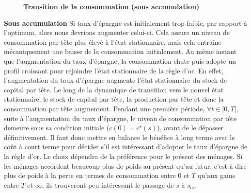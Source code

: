 \documentclass[10pt,a4paper,notitlepage]{report}
\begin{document}
\begin{wrapfigure}{r}{0.5\textwidth}
  \vspace{-20pt}
  \begin{center}
    
  \end{center}
  \vspace{-10pt}
  \caption{\textbf{Transition de la consommation (sous accumulation)}}
  \vspace{-10pt}
\end{wrapfigure}
\textbf{Sous  accumulation} Si  taux d'épargne  est initialement  trop
faible,  par  rapport  à  l'optimum,  alors  nous  devrions  augmenter
celui-ci. Cela assure un niveau de  consommation par tête plus élevé à
l'état stationnaire, mais cela entraîne mécaniquement une baisse de la
consommation initialement. Au même  instant que l'augmentation du taux
d'épargne, la consommation chute puis  adopte un profil croissant pour
rejoindre   l'état  stationnaire   de  la   règle  d'or.    En  effet,
l'augmentation du taux d'épargne augmente l'état stationnaire du stock
de capital  par tête. Le  long de la  dynamique de transition  vers le
nouvel état stationnaire, le stock  de capital par tête, la production
par tête  et donc  la consommation par  tête augmentent.   Pendant une
première période,  $\forall t  \in [0,T[$,  suite à  l'augmentation du
taux d'épargne,  le niveau  de consommation par  tête demeure  sous sa
condition  initiale   ($c(0)=c^{\star}(s)$),  avant  de   le  dépasser
définitivement.  Il  faut donc  mettre en balance  le bénéfice  à long
terme avec  le coût à  court terme  pour décider s'il  est intéressant
d'adopter le taux d'épargne de la  règle d'or. Le choix dépendra de la
préférence  pour le  présent des  ménages.  Si  les ménages  accordent
beaucoup plus  de poids au  présent qu'au futur, c'est-à-dire  plus de
poids à  la perte en  termes de consommation  entre $0$ et  $T$ qu'aux
gains entre $T$ et $\infty$, ils trouveront peu intéressant le passage
de $s$ à $s_{\mathrm{or}}$.\newline
\end{document}

